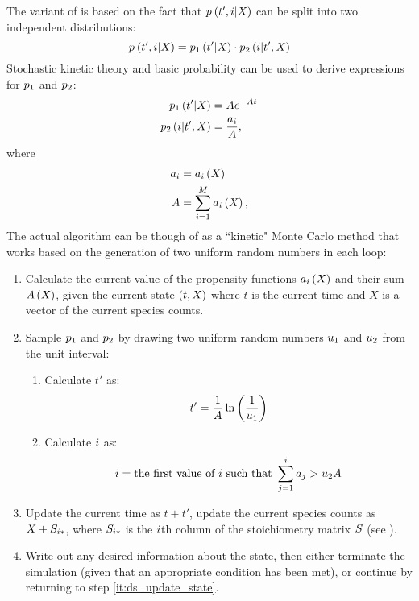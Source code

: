 The  variant of  is based on the fact that $p_{} \left( t', i | X_{} \right)$ can be split into two independent distributions:
\begin{equation*}
    p_{} \left( t', i | X_{} \right) = p_{1} \left( t' | X_{} \right) \cdot p_{2} \left( i | t', X_{} \right)
\end{equation*}
Stochastic kinetic theory and basic probability can be used to derive expressions\supercite{Gillespie:1976bj} for $p_{1}$ and $p_{2}$:
\begin{align}\label{eq:ds_probs}
    \begin{split}
        p_{1} \left( t' | X_{} \right) &= A e^{-A t} \\
        p_{2} \left( i | t', X_{} \right) &= \frac{a_{i}}{A},
    \end{split}
\end{align}
where
\begin{align*}
    \begin{split}
        a_{i} &= a_{i} \left( X_{} \right) \\
        A &= \sum_{i=1}^{M}a_{i} \left( X_{} \right),
    \end{split}
\end{align*}
The actual  algorithm can be though of as a ``kinetic" Monte Carlo method\supercite{Gillespie:2007bx} that works based on the generation of two uniform random numbers in each loop:
\begin{enumerate}
    \item\label{it:ds_update_state} Calculate the current value of the propensity functions $a_{i} \left( X_{} \right)$ and their sum $A \left( X_{} \right)$, given the current state $\left( t, X_{} \right)$ where $t$ is the current time and $X$ is a vector of the current species counts.
    \item Sample $p_{1}$ and $p_{2}$ by drawing two uniform random numbers $u_{1}$ and $u_{2}$ from the unit interval:
    \begin{enumerate}
        \item Calculate $t'$ as:
        \begin{equation*}
            t' = \frac{1}{A} \ln \left( \frac{1}{u_{1}} \right)
        \end{equation*}
        \item Calculate $i$ as:
        \begin{equation*}
            i = \textrm{the first value of $i$ such that } \sum_{j=1}^{i} a_{j} > u_{2} A
        \end{equation*} 
    \end{enumerate}
    \item Update the current time as $t + t'$, update the current species counts as $X_{} + S_{i *}$, where $S_{i *}$ is the $i$th column of the stoichiometry matrix $S$ (see ).
    \item Write out any desired information about the state, then either terminate the simulation (given that an appropriate condition has been met), or continue by returning to step \ref{it:ds_update_state}.
\end{enumerate}
